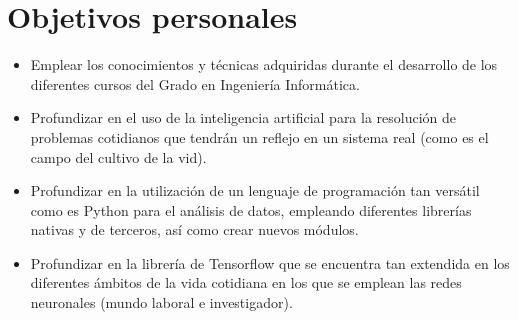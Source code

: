 \section{Objetivos personales}
\begin{itemize}
    \item Emplear los conocimientos y técnicas adquiridas durante el desarrollo de los diferentes
        cursos del Grado en Ingeniería Informática.
    \item Profundizar en el uso de la inteligencia artificial para la resolución de 
        problemas cotidianos que tendrán un reflejo en un sistema real (como es el
        campo del cultivo de la vid).
    \item Profundizar en la utilización de un lenguaje de programación tan versátil
        como es Python para el análisis de datos, empleando diferentes librerías
        nativas y de terceros, así como crear nuevos módulos.
    \item Profundizar en la librería de Tensorflow que se encuentra tan extendida
        en los diferentes ámbitos de la vida cotidiana en los que se emplean las redes 
        neuronales (mundo laboral e investigador). 
\end{itemize}